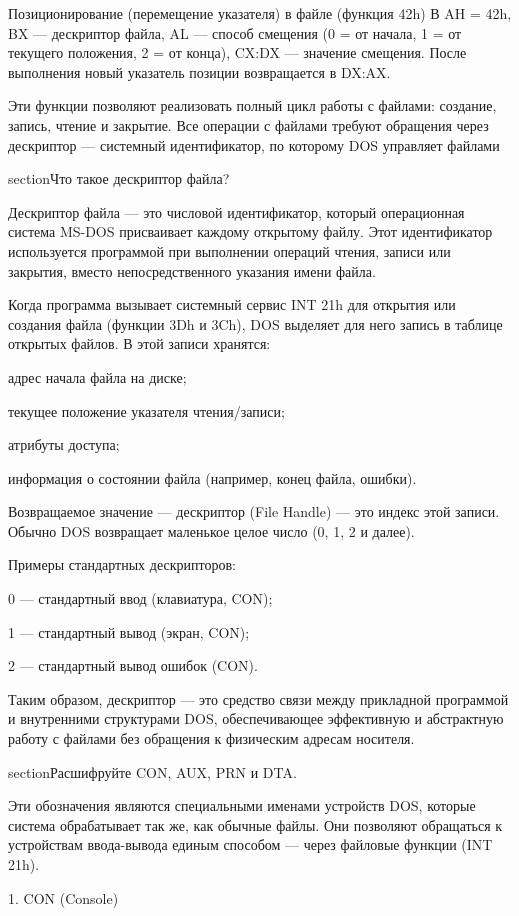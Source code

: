 Позиционирование (перемещение указателя) в файле (функция 42h)
В AH = 42h, BX — дескриптор файла, AL — способ смещения (0 = от начала, 1 = от текущего положения, 2 = от конца), CX:DX — значение смещения.
После выполнения новый указатель позиции возвращается в DX:AX.

Эти функции позволяют реализовать полный цикл работы с файлами: создание, запись, чтение и закрытие. Все операции с файлами требуют обращения через дескриптор — системный идентификатор, по которому DOS управляет файлами

section{Что такое дескриптор файла?}

Дескриптор файла — это числовой идентификатор, который операционная система MS-DOS присваивает каждому открытому файлу. Этот идентификатор используется программой при выполнении операций чтения, записи или закрытия, вместо непосредственного указания имени файла.

Когда программа вызывает системный сервис INT 21h для открытия или создания файла (функции 3Dh и 3Ch), DOS выделяет для него запись в таблице открытых файлов. В этой записи хранятся:

адрес начала файла на диске;

текущее положение указателя чтения/записи;

атрибуты доступа;

информация о состоянии файла (например, конец файла, ошибки).

Возвращаемое значение — дескриптор (File Handle) — это индекс этой записи. Обычно DOS возвращает маленькое целое число (0, 1, 2 и далее).

Примеры стандартных дескрипторов:

0 — стандартный ввод (клавиатура, CON);

1 — стандартный вывод (экран, CON);

2 — стандартный вывод ошибок (CON).

Таким образом, дескриптор — это средство связи между прикладной программой и внутренними структурами DOS, обеспечивающее эффективную и абстрактную работу с файлами без обращения к физическим адресам носителя.

section{Расшифруйте CON, AUX, PRN и DTA.}

Эти обозначения являются специальными именами устройств DOS, которые система обрабатывает так же, как обычные файлы. Они позволяют обращаться к устройствам ввода-вывода единым способом — через файловые функции (INT 21h).

1. CON (Console)

